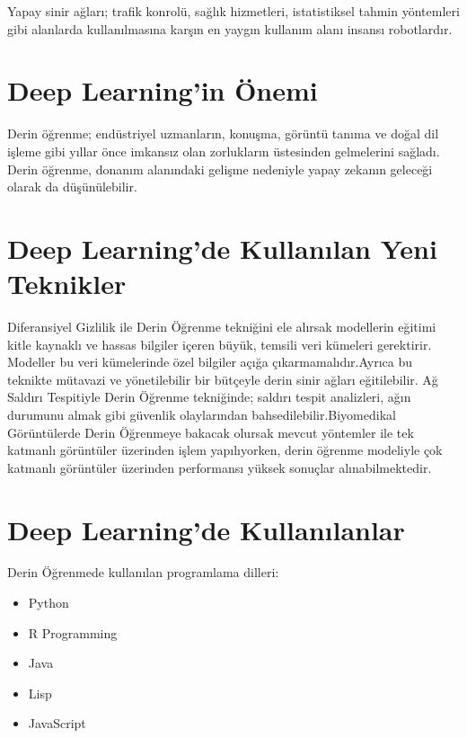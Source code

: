 \documentclass{IEEEtran}
\begin{document}
        \hspace{6}
        Yapay sinir ağları; trafik konrolü, sağlık hizmetleri, istatistiksel tahmin yöntemleri gibi alanlarda kullanılmasına karşın en yaygın kullanım alanı insansı robotlardır.
        \vspace{10pt}

    
    \section{Deep Learning'in Önemi }
        \label{sec:Onemi}
            Derin öğrenme; endüstriyel uzmanların, konuşma, görüntü tanıma ve doğal dil işleme gibi yıllar önce imkansız olan zorlukların üstesinden gelmelerini sağladı. Derin öğrenme, donanım alanındaki gelişme nedeniyle yapay zekanın geleceği olarak da düşünülebilir.
            \vspace{10pt}
       

    
    \section{Deep Learning'de Kullanılan Yeni Teknikler }
        \label{sec:yeniteknikler}
            Diferansiyel Gizlilik ile Derin Öğrenme tekniğini ele alırsak modellerin eğitimi kitle kaynaklı ve hassas bilgiler içeren büyük, temsili veri kümeleri gerektirir. Modeller bu veri kümelerinde özel bilgiler açığa çıkarmamalıdır.Ayrıca bu teknikte mütavazi ve yönetilebilir bir bütçeyle derin sinir ağları eğitilebilir. Ağ Saldırı Tespitiyle Derin Öğrenme tekniğinde; saldırı tespit analizleri, ağın durumunu almak gibi güvenlik olaylarından bahsedilebilir.Biyomedikal Görüntülerde Derin Öğrenmeye bakacak olursak mevcut yöntemler ile tek katmanlı görüntüler üzerinden işlem yapılıyorken, derin öğrenme modeliyle çok katmanlı görüntüler üzerinden performansı yüksek sonuçlar alınabilmektedir.
            \vspace{10pt}

    
    \section{Deep Learning'de Kullanılanlar}
        \label{sec:frameworkler}
            Derin Öğrenmede kullanılan programlama dilleri: \cite{ProgrammingLanguages}
            \begin{itemize}
               \item Python
               \item R Programming
               \item Java
               \item Lisp
               \item JavaScript
            \end{itemize}
            
\end{document}
